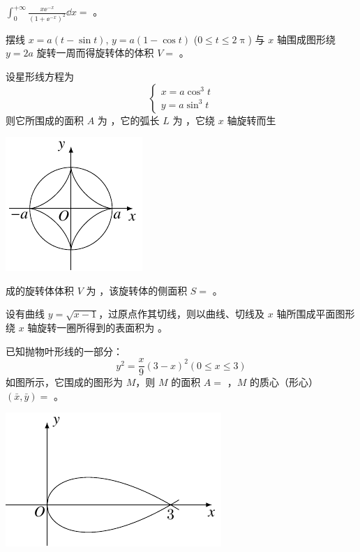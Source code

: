 \begin{ti}
	$\int_0^{+\infty} \frac{x \ee^{-x}}{(1 + \ee^{-x})^2} \dd{x} = $ \hua。
\end{ti}

\begin{ti}
	摆线 $x = a (t - \sin t)$, $y = a(1 - \cos t)$ ($0 \leq t \leq 2 \uppi$) 与 $x$ 轴围成图形绕 $y = 2a$ 旋转一周而得旋转体的体积 $V = $ \hua。
\end{ti}

\begin{ti}
	\parbox[t]{0.7\textwidth}{%
	\vspace{0pt}设星形线方程为
	\[
		\begin{cases}
			x = a \cos^3 t \\
			y = a \sin^3 t
		\end{cases}
	\]
	则它所围成的面积 $A$ 为 \hua，它的弧长 $L$ 为 \hua，它绕 $x$ 轴旋转而生
	}\vspace{4.5bp}%
	\begin{varwidth}[t]{\textwidth}
		\vspace{0pt}\includegraphics{figure/fig71.pdf}
	\end{varwidth}
	成的旋转体体积 $V$ 为 \hua，该旋转体的侧面积 $S = $ \hua。
\end{ti}

\begin{ti}
	设有曲线 $y = \sqrt{x-1}$，过原点作其切线，则以曲线、切线及 $x$ 轴所围成平面图形绕 $x$ 轴旋转一圈所得到的表面积为 \hua。
\end{ti}

\begin{ti}
	\parbox[c]{0.55\textwidth}{%
	已知抛物叶形线的一部分：
	\[
		y^2 = \frac{x}{9} (3-x)^2 (0 \leq x \leq 3)
	\]
	如图所示，它围成的图形为 $M$，则 $M$ 的面积 $A = $ \hua，$M$ 的质心（形心）$(\bar x,\bar y) = $ \hua。
	}%
	\begin{varwidth}[c]{\textwidth}
		\vspace{0pt}\includegraphics{figure/fig73.pdf}
	\end{varwidth}
\end{ti}


